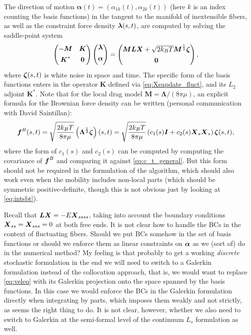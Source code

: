 The direction of motion $\bm{\alpha}(t)=(\alpha_{1k}(t),\alpha_{2k}(t))$ (here $k$ is an index counting the basis functions) in the tangent to the manifold of inextensible fibers, as well as the constraint force density $\boldsymbol{\lambda}(s,t)$, are computed by solving the saddle-point system
\begin{equation}
\label{eq:saddleL2_fluct}
\begin{pmatrix}
-\boldsymbol{M} & \boldsymbol{K}\\[4 pt]
\boldsymbol{K}^* & \boldsymbol{0}
\end{pmatrix}
\begin{pmatrix} 
\boldsymbol{\lambda}\\[4 pt]
\boldsymbol{\alpha}\\[4 pt]
\end{pmatrix} =  \begin{pmatrix} 
\boldsymbol{M}\boldsymbol{L}\boldsymbol{X} + \sqrt{2 k_B T} \boldsymbol{M}^{\frac{1}{2}} \boldsymbol{\zeta} \\[4 pt]
\boldsymbol{0}\end{pmatrix},
\end{equation}
where $\boldsymbol{\zeta}(s,t)$ is white noise in space and time. The specific form of the basis functions enters in the operator $\bm{K}$ defined via \eqref{eq:Xsupdate_fluct}, and its $L_2$ adjoint $\bm{K}^*$. Note that for the local drag model $\bm{M}=\bm{\Lambda}/(8\pi\mu)$, an explicit formula for the Brownian force density can be written (personal communication with David Saintillan):
\begin{equation}
\boldsymbol{f}^B(s,t) = \sqrt{\frac{2 k_B T}{8\pi\mu}} \left(\boldsymbol{\Lambda}^{\frac{1}{2}} \boldsymbol{\zeta}\right)(s,t) =  
	\sqrt{\frac{2 k_B T}{8\pi\mu}} \left( c_1(s) \boldsymbol{I} + c_2(s) \boldsymbol{X}_s \boldsymbol{X}_s \right) \boldsymbol{\zeta}(s,t),
\end{equation}
where the form of $c_1(s)$ and $c_2(s)$ can be computed by computing the covariance of $\boldsymbol{f}^B$ and comparing it against \eqref{eq:c_t_general}. But this form should not be required in the formulation of the algorithm, which should also work even when the mobility includes non-local parts (which should be symmetric positive-definite, though this is not obvious just by looking at \eqref{eq:intsbt}).

Recall that $\boldsymbol{L}\boldsymbol{X}=-E \boldsymbol{X}_{ssss}$, taking into account the boundary conditions $\boldsymbol{X}_{ss}=\boldsymbol{X}_{sss}=0$ at both free ends. It is not clear how to handle the BCs in the context of fluctuating fibers. Should we put BCs somehow in the set of basis functions or should we enforce them as linear constraints on $\boldsymbol{\alpha}$ as we (sort of) do in the numerical method? My feeling is that probably to get a working \emph{discrete} stochastic formulation in the end we will need to switch to a Galerkin formulation instead of the collocation approach, that is, we would want to replace \eqref{eq:veleq} with its Galerkin projection onto the space spanned by the basis functions. In this case we would enforce the BCs in the Galerkin formulation directly when integrating by parts, which imposes them weakly and not strictly, as seems the right thing to do. It is not clear, however, whether we also need to switch to Galerkin at the semi-formal level of the continuum $L_s$ formulation as well.


